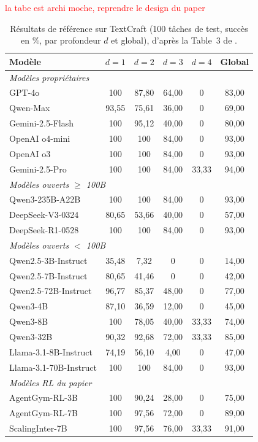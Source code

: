\documentclass[11pt,a4paper]{article}
\begin{document}
\textcolor{red}{la tabe est archi moche, reprendre le design du paper}
\begin{table}[htbp]
\centering
\caption{Résultats de référence sur TextCraft (100 tâches de test, succès en \%, par profondeur $d$ et global), d'après la Table~3 de \cite{xi_agentgym-rl_2025}.}
\label{tab:agentgym_textcraft}
\begin{tabular}{lccccc}
\toprule
Modèle & $d{=}1$ & $d{=}2$ & $d{=}3$ & $d{=}4$ & Global \\
\midrule
\multicolumn{6}{l}{\emph{Modèles propriétaires}} \\
GPT-4o & 100 & 87{,}80 & 64{,}00 & 0 & 83{,}00 \\
Qwen-Max & 93{,}55 & 75{,}61 & 36{,}00 & 0 & 69{,}00 \\
Gemini-2.5-Flash & 100 & 95{,}12 & 40{,}00 & 0 & 80{,}00 \\
OpenAI o4-mini & 100 & 100 & 84{,}00 & 0 & 93{,}00 \\
OpenAI o3 & 100 & 100 & 84{,}00 & 0 & 93{,}00 \\
Gemini-2.5-Pro & 100 & 100 & 84{,}00 & 33{,}33 & 94{,}00 \\
\midrule
\multicolumn{6}{l}{\emph{Modèles ouverts $\geq$ 100B}} \\
Qwen3-235B-A22B & 100 & 100 & 84{,}00 & 0 & 93{,}00 \\
DeepSeek-V3-0324 & 80{,}65 & 53{,}66 & 40{,}00 & 0 & 57{,}00 \\
DeepSeek-R1-0528 & 100 & 100 & 84{,}00 & 0 & 93{,}00 \\
\midrule
\multicolumn{6}{l}{\emph{Modèles ouverts $<$ 100B}} \\
Qwen2.5-3B-Instruct & 35{,}48 & 7{,}32 & 0 & 0 & 14{,}00 \\
Qwen2.5-7B-Instruct & 80{,}65 & 41{,}46 & 0 & 0 & 42{,}00 \\
Qwen2.5-72B-Instruct & 96{,}77 & 85{,}37 & 48{,}00 & 0 & 77{,}00 \\
Qwen3-4B & 87{,}10 & 36{,}59 & 12{,}00 & 0 & 45{,}00 \\
Qwen3-8B & 100 & 78{,}05 & 40{,}00 & 33{,}33 & 74{,}00 \\
Qwen3-32B & 90{,}32 & 92{,}68 & 72{,}00 & 33{,}33 & 85{,}00 \\
Llama-3.1-8B-Instruct & 74{,}19 & 56{,}10 & 4{,}00 & 0 & 47{,}00 \\
Llama-3.1-70B-Instruct & 100 & 100 & 84{,}00 & 0 & 93{,}00 \\
\midrule
\multicolumn{6}{l}{\emph{Modèles RL du papier}} \\
AgentGym-RL-3B & 100 & 90{,}24 & 28{,}00 & 0 & 75{,}00 \\
AgentGym-RL-7B & 100 & 97{,}56 & 72{,}00 & 0 & 89{,}00 \\
ScalingInter-7B & 100 & 97{,}56 & 76{,}00 & 33{,}33 & 91{,}00 \\
\bottomrule
\end{tabular}
\end{table}
\end{document}
